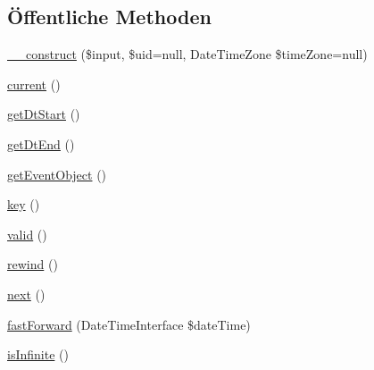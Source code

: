 \subsection*{Öffentliche Methoden}
\begin{DoxyCompactItemize}
\item 
\mbox{\hyperlink{class_sabre_1_1_v_object_1_1_recur_1_1_event_iterator_a02b3a19f3e2ad1e7f49e9c02ced5135c}{\+\_\+\+\_\+construct}} (\$input, \$uid=null, Date\+Time\+Zone \$time\+Zone=null)
\item 
\mbox{\hyperlink{class_sabre_1_1_v_object_1_1_recur_1_1_event_iterator_a72e09d20d602ed05da2a4728770bdff6}{current}} ()
\item 
\mbox{\hyperlink{class_sabre_1_1_v_object_1_1_recur_1_1_event_iterator_ad93a1a5cf2a2ec68f8f3e17e88594159}{get\+Dt\+Start}} ()
\item 
\mbox{\hyperlink{class_sabre_1_1_v_object_1_1_recur_1_1_event_iterator_a973cbb7f6c8b387b8130c5e3ee445fdc}{get\+Dt\+End}} ()
\item 
\mbox{\hyperlink{class_sabre_1_1_v_object_1_1_recur_1_1_event_iterator_a66dd3c533cde8d55dba168ea084d8962}{get\+Event\+Object}} ()
\item 
\mbox{\hyperlink{class_sabre_1_1_v_object_1_1_recur_1_1_event_iterator_a4c71a67e03af5dddfac4f99de11faedc}{key}} ()
\item 
\mbox{\hyperlink{class_sabre_1_1_v_object_1_1_recur_1_1_event_iterator_a65fb707d2e909a2011f499b1435baceb}{valid}} ()
\item 
\mbox{\hyperlink{class_sabre_1_1_v_object_1_1_recur_1_1_event_iterator_a6bf965f95f1b9ed5d6f8f5784ac74676}{rewind}} ()
\item 
\mbox{\hyperlink{class_sabre_1_1_v_object_1_1_recur_1_1_event_iterator_a7ca061a824bb8902589cfc69c197372d}{next}} ()
\item 
\mbox{\hyperlink{class_sabre_1_1_v_object_1_1_recur_1_1_event_iterator_aedf9da3d9ea6e81bd5d6805c3b9750d3}{fast\+Forward}} (Date\+Time\+Interface \$date\+Time)
\item 
\mbox{\hyperlink{class_sabre_1_1_v_object_1_1_recur_1_1_event_iterator_a85963da91fefa98d858c910e1cce95da}{is\+Infinite}} ()
\end{DoxyCompactItemize}

